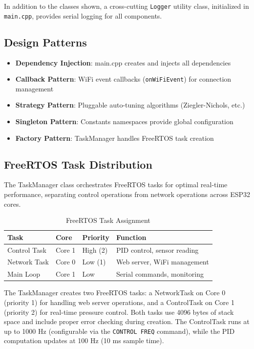 In addition to the classes shown, a cross-cutting \texttt{Logger} utility class, initialized in \texttt{main.cpp}, provides serial logging for all components.

\subsection{Design Patterns}
\begin{itemize}
    \item \textbf{Dependency Injection}: main.cpp creates and injects all dependencies
    \item \textbf{Callback Pattern}: WiFi event callbacks (\texttt{onWiFiEvent}) for connection management
    \item \textbf{Strategy Pattern}: Pluggable auto-tuning algorithms (Ziegler-Nichols, etc.)
    \item \textbf{Singleton Pattern}: Constants namespaces provide global configuration
    \item \textbf{Factory Pattern}: TaskManager handles FreeRTOS task creation
\end{itemize}

\subsection{FreeRTOS Task Distribution}

The TaskManager class orchestrates FreeRTOS tasks for optimal real-time performance, separating control operations from network operations across ESP32 cores.

\begin{table}[H]
\centering
\begin{tabular}{@{}llll@{}}
\toprule
\textbf{Task} & \textbf{Core} & \textbf{Priority} & \textbf{Function} \\
\midrule
Control Task & Core 1 & High (2) & PID control, sensor reading \\
Network Task & Core 0 & Low (1) & Web server, WiFi management \\
Main Loop & Core 1 & Low & Serial commands, monitoring \\
\bottomrule
\end{tabular}
\caption{FreeRTOS Task Assignment}
\end{table}

The TaskManager creates two FreeRTOS tasks: a NetworkTask on Core 0 (priority 1) for handling web server operations, and a ControlTask on Core 1 (priority 2) for real-time pressure control. Both tasks use 4096 bytes of stack space and include proper error checking during creation. The ControlTask runs at up to 1000 Hz (configurable via the \texttt{CONTROL FREQ} command), while the PID computation updates at 100 Hz (10 ms sample time).
